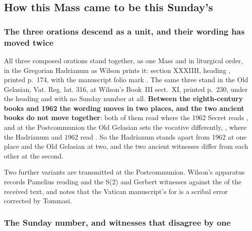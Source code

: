 \subsection*{How this Mass came to be this Sunday's}

\subsubsection*{The three orations descend as a unit, and their wording has moved twice}

All three composed orations stand together, as one Mass and in liturgical order,
in the Gregorian Hadrianum as Wilson prints it: section XXXIIII, heading
, printed p.~174, with the manuscript
folio mark \latin{[fo. 168v]}. The same three stand in the Old Gelasian, Vat.
Reg. lat. 316, at Wilson's Book~III sect.~XI, printed p.~230, under the heading
 and with no Sunday number at all. \textbf{Between the
eighth-century books and 1962 the wording moves in two places, and the two
ancient books do not move together}: both of them read  where the 1962 Secret reads , and at the Postcommunion the Old Gelasian sets the
vocative differently, , where the Hadrianum
and 1962 read . So the Hadrianum stands apart
from 1962 at one place and the Old Gelasian at two, and the two ancient witnesses
differ from each other at the second.

Two further variants are transmitted at the Postcommunion. Wilson's apparatus
records Pamelius reading  and the S(2) and Gerbert
witnesses  against the  of the received text, and notes that the Vatican manuscript's
 for  is a scribal error corrected by Tommasi.

\subsubsection*{The Sunday number, and witnesses that disagree by one}

